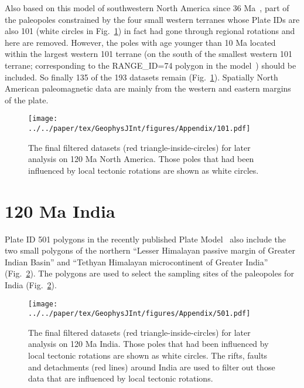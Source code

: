 Also based on this model of southwestern North America since 36 Ma~\citep{Mc06},
part of the paleopoles constrained by the four small western terranes whose
Plate IDs are also 101 (white circles in Fig.~\ref{fig_NAfinal}) in fact had gone through regional
rotations and here are removed. However, the poles with age younger than 10 Ma
located within the largest western 101 terrane (on the south of the smallest
western 101 terrane; corresponding to the RANGE\_ID=74 polygon in the
model~\citep{Mc06}) should be included. So finally 135 of the 193 datasets remain
(Fig.~\ref{fig_NAfinal}). Spatially North American paleomagnetic data are mainly
from the western and eastern margins of the plate.

\begin{figure}[!ht]
\texttt{[image: ../../paper/tex/GeophysJInt/figures/Appendix/101.pdf]}
  \caption[Final filtered datasets for analysis on 120 Ma North
America]{The final filtered datasets (red triangle-inside-circles) for later
analysis on 120 Ma North America. Those poles that had been
influenced by local tectonic rotations are shown as white
circles.}\label{fig_NAfinal}
\end{figure}

\section{120 Ma India}

Plate ID 501 polygons in the recently published Plate Model~\citep{Y18} also
include the two small polygons of the northern ``Lesser Himalayan passive
margin of Greater Indian Basin'' and ``Tethyan Himalayan microcontinent of
Greater India'' (Fig.~\ref{fig_INfinal}). The polygons are used to select the
sampling sites of the paleopoles for India (Fig.~\ref{fig_INfinal}).

\begin{figure}[!ht]
\texttt{[image: ../../paper/tex/GeophysJInt/figures/Appendix/501.pdf]}
\caption[Final filtered datasets for analysis on 120 Ma India]{The
final filtered datasets (red triangle-inside-circles) for later
analysis on 120 Ma India. Those poles that had been influenced by
local tectonic rotations are shown as white circles. The rifts, faults and
detachments (red lines) around India are used to filter out those data that
are influenced by local tectonic rotations.}\label{fig_INfinal}
\end{figure}

